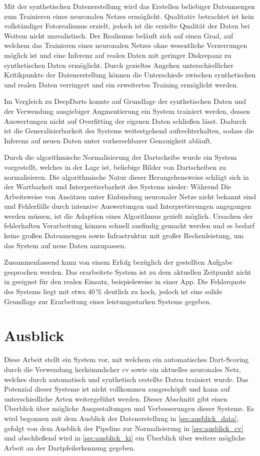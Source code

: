 Mit der synthetischen Datenerstellung wird das Erstellen beliebiger Datenmengen zum Trainieren eines neuronalen Netzes ermöglicht. Qualitativ betrachtet ist kein vollständiger Fotorealismus erzielt, jedoch ist die erzielte Qualität der Daten bei Weitem nicht unrealistisch. Der Realismus beläuft sich auf einen Grad, auf welchem das Trainieren eines neuronalen Netzes ohne wesentliche Verzerrungen möglich ist und eine Inferenz auf realen Daten mit geringer Diskrepanz zu synthetischen Daten ermöglicht. Durch gezieltes Angehen unterschiedlicher Kritikpunkte der Datenerstellung können die Unterschiede zwischen synthetischen und realen Daten verringert und ein erweitertes Training ermöglicht werden.

Im Vergleich zu DeepDarts konnte auf Grundlage der synthetischen Daten und der Verwendung ausgiebiger Augmentierung ein System trainiert werden, dessen Auswertungen nicht auf Overfitting der eigenen Daten schließen lässt. Dadurch ist die Generalisierbarkeit des Systems weitestgehend aufrechterhalten, sodass die Inferenz auf neuen Daten unter vorhersehbarer Genauigkeit abläuft.

Durch die algorithmische Normalisierung der Dartscheibe wurde ein System vorgestellt, welches in der Lage ist, beliebige Bilder von Dartscheiben zu normalisieren. Die algorithmische Natur dieser Herangehensweise schlägt sich in der Wartbarkeit und Interpretierbarkeit des Systems nieder: Während Die Arbeitsweise von Ansätzen unter Einbindung neuronaler Netze nicht bekannt sind und Fehlerfälle durch intensive Auswertungen und Interpretierungen angegangen werden müssen, ist die Adaption eines Algorithmus gezielt möglich. Ursachen der fehlerhaften Verarbeitung können schnell ausfindig gemacht werden und es bedarf keine großen Datenmengen sowie Infrastruktur mit großer Rechenleistung, um das System auf neue Daten anzupassen.

Zusammenfassend kann von einem Erfolg bezüglich der gestellten Aufgabe gesprochen werden. Das erarbeitete System ist zu dem aktuellen Zeitpunkt nicht in geeignet für den realen Einsatz, beispielsweise in einer App. Die Fehlerquote des Systems liegt mit etwa $40\,\%$ deutlich zu hoch, jedoch ist eine solide Grundlage zur Erarbeitung eines leistungsstarken Systems gegeben.

\section{Ausblick}
\label{sec:ausblick}

Diese Arbeit stellt ein System vor, mit welchem ein automatisches Dart-Scoring durch die Verwendung herkömmlicher \ac{cv} sowie ein aktuelles neuronales Netz, welches durch automatisch und synthetisch erstellte Daten trainiert wurde. Das Potenzial dieser Systeme ist nicht vollkommen ausgeschöpft und kann auf unterschiedliche Arten weitergeführt werden. Dieser Abschnitt gibt einen Überblick über mögliche Ausgestaltungen und Verbesserungen dieser Systeme. Es wird begonnen mit dem Ausblick der Datenerstellung in \autoref{sec:ausblick_data}, gefolgt von dem Ausblick der Pipeline zur Normalisierung in \autoref{sec:ausblick_cv} und abschließend wird in \autoref{sec:ausblick_ki} ein Überblick über weitere mögliche Arbeit an der Dartpfeilerkennung gegeben.

